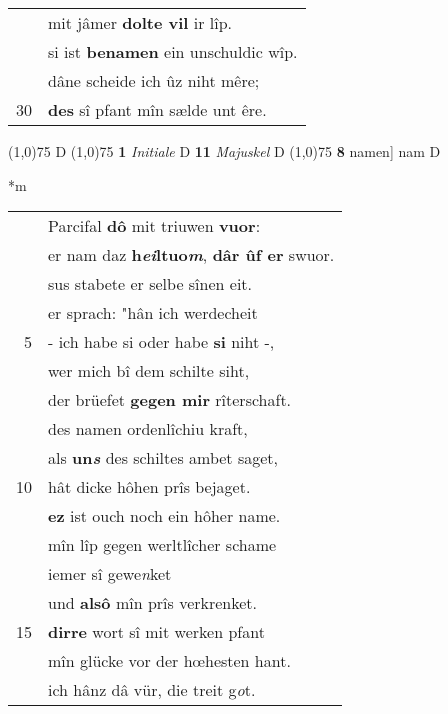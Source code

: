 \documentclass[8pt,a4paper,notitlepage]{article}
\begin{document}
\begin{table}[ht]
\begin{minipage}[t]{0.5\linewidth}
\begin{tabular}{rl}
 & mit jâmer \textbf{dolte vil} ir lîp.\\ 
 & si ist \textbf{benamen} ein unschuldic wîp.\\ 
 & dâne scheide ich ûz niht mêre;\\ 
30 & \textbf{des} sî pfant mîn sælde unt êre.\\ 
\end{tabular}
\scriptsize
\line(1,0){75} \newline
D \newline
\line(1,0){75} \newline
\textbf{1} \textit{Initiale} D  \textbf{11} \textit{Majuskel} D  \newline
\line(1,0){75} \newline
\textbf{8} namen] nam D \newline
\end{minipage}
\hspace{0.5cm}
\begin{minipage}[t]{0.5\linewidth}
\small
\begin{center}*m
\end{center}
\begin{tabular}{rl}
 & Parcifal \textbf{dô} mit triuwen \textbf{vuor}:\\ 
 & er nam daz \textbf{h\textit{ei}ltuo\textit{m}}, \textbf{dâr ûf er} swuor.\\ 
 & sus stabete er selbe sînen eit.\\ 
 & er sprach: "hân ich werdecheit\\ 
5 & - ich habe si oder habe \textbf{si} niht -,\\ 
 & wer mich bî dem schilte siht,\\ 
 & der brüefet \textbf{gegen mir} rîterschaft.\\ 
 & des namen ordenlîchiu kraft,\\ 
 & als \textbf{un\textit{s}} des schiltes ambet saget,\\ 
10 & hât dicke hôhen prîs bejaget.\\ 
 & \textbf{ez} ist ouch noch ein hôher name.\\ 
 & mîn lîp gegen werltlîcher schame\\ 
 & iemer sî gewe\textit{n}ket\\ 
 & und \textbf{alsô} mîn prîs verkrenket.\\ 
15 & \textbf{dirre} wort sî mit werken pfant\\ 
 & mîn glücke vor der hœhesten hant.\\ 
 & ich hânz dâ vür, die treit g\textit{o}t.\\ 

\end{tabular}
\end{minipage}
\end{table}
\end{document}
